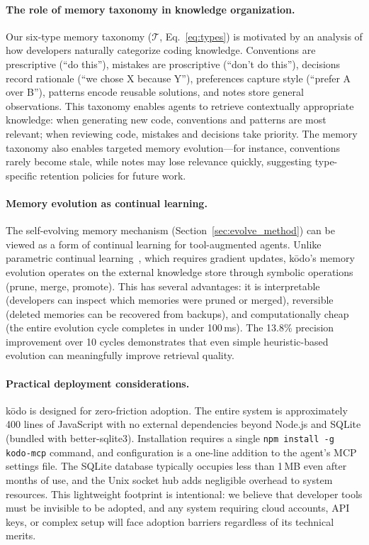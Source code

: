 \documentclass{article}
\begin{document}
\paragraph{The role of memory taxonomy in knowledge organization.} Our six-type memory taxonomy ($\mathcal{T}$, Eq.~\ref{eq:types}) is motivated by an analysis of how developers naturally categorize coding knowledge. Conventions are prescriptive (``do this''), mistakes are proscriptive (``don't do this''), decisions record rationale (``we chose X because Y''), preferences capture style (``prefer A over B''), patterns encode reusable solutions, and notes store general observations. This taxonomy enables agents to retrieve contextually appropriate knowledge: when generating new code, conventions and patterns are most relevant; when reviewing code, mistakes and decisions take priority. The memory taxonomy also enables targeted memory evolution---for instance, conventions rarely become stale, while notes may lose relevance quickly, suggesting type-specific retention policies for future work.

\paragraph{Memory evolution as continual learning.} The self-evolving memory mechanism (Section~\ref{sec:evolve_method}) can be viewed as a form of continual learning for tool-augmented agents. Unlike parametric continual learning~\cite{brown2020gpt3}, which requires gradient updates, k\=odo's memory evolution operates on the external knowledge store through symbolic operations (prune, merge, promote). This has several advantages: it is interpretable (developers can inspect which memories were pruned or merged), reversible (deleted memories can be recovered from backups), and computationally cheap (the entire evolution cycle completes in under 100\,ms). The 13.8\% precision improvement over 10 cycles demonstrates that even simple heuristic-based evolution can meaningfully improve retrieval quality.

\paragraph{Practical deployment considerations.} k\=odo is designed for zero-friction adoption. The entire system is approximately 400 lines of JavaScript with no external dependencies beyond Node.js and SQLite (bundled with better-sqlite3). Installation requires a single \texttt{npm install -g kodo-mcp} command, and configuration is a one-line addition to the agent's MCP settings file. The SQLite database typically occupies less than 1\,MB even after months of use, and the Unix socket hub adds negligible overhead to system resources. This lightweight footprint is intentional: we believe that developer tools must be invisible to be adopted, and any system requiring cloud accounts, API keys, or complex setup will face adoption barriers regardless of its technical merits.
\end{document}
